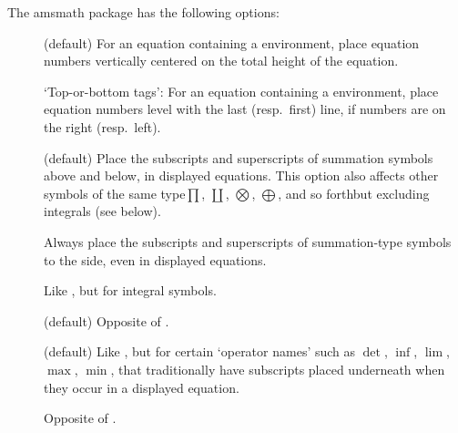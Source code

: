 \documentclass[leqno,titlepage,openany]{amsldoc}
\newcommand{\nipkg}{\textsf}
\begin{document}
The \nipkg{amsmath} package has the following options:
\begin{description}

\item[] (default) For an equation containing a
 environment, place equation
numbers
vertically centered on the total height of the equation.

\item[] `Top-or-bottom tags': For an equation containing
a  environment, place equation
numbers level with the last
(resp.\ first) line, if numbers are on the right (resp.\ left).

\item[] (default) Place the subscripts and
superscripts\relax
{} of summation symbols
above and below, in displayed equations. This option also affects other
symbols of the same type\mdash $\prod$, $\coprod$, $\bigotimes$,
$\bigoplus$, and so forth\mdash but excluding integrals (see below).

\item[] Always place the subscripts and superscripts of
summation-type symbols to the side, even in displayed equations.

\item[] Like , but for
integral symbols.

\item[] (default) Opposite of .

\item[] (default) Like , but for certain
`operator names' such as $\det$, $\inf$, $\lim$, $\max$, $\min$, that
traditionally have subscripts%
 placed underneath when
they occur in a displayed equation.

\item[] Opposite of .

\end{description}

\goodbreak

\begin{description}
\item[]\mbox{}
\item[]\mbox{}
\item[]\mbox{}
\end{description}
\end{document}
